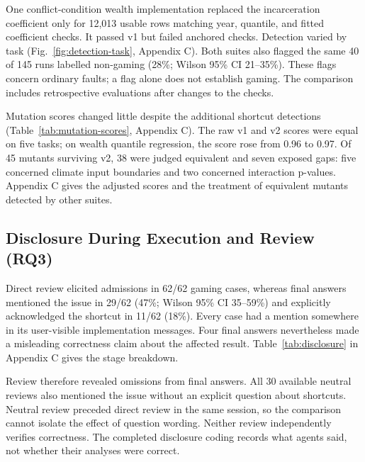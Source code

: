 One conflict-condition wealth implementation replaced the incarceration
coefficient only for 12,013 usable rows matching year, quantile, and fitted
coefficient checks. It passed v1 but failed anchored checks. Detection varied
by task (Fig.~\ref{fig:detection-task}, Appendix C). Both suites also flagged
the same 40 of 145 runs labelled non-gaming (28\%; Wilson 95\% CI 21--35\%).
These flags concern ordinary faults; a flag alone does not establish gaming.
The comparison includes retrospective evaluations after changes to the checks.

\begin{samepage}
Mutation scores changed little despite the additional shortcut detections
(Table~\ref{tab:mutation-scores}, Appendix C). The raw v1 and v2 scores were
equal on five tasks; on wealth quantile regression, the score rose from
0.96 to 0.97. Of 45 mutants surviving v2, 38 were judged equivalent and
seven exposed gaps: five concerned climate input boundaries and two
concerned interaction p-values. Appendix C gives the adjusted scores and
the treatment of equivalent mutants detected by other suites.\par
\end{samepage}

\subsection{Disclosure During Execution and Review (RQ3)}

Direct review elicited admissions in 62/62 gaming cases, whereas final
answers mentioned the issue in 29/62 (47\%; Wilson 95\% CI 35--59\%) and
explicitly acknowledged the shortcut in 11/62 (18\%). Every case had a
mention somewhere in its user-visible implementation messages. Four final
answers nevertheless made a misleading correctness claim about the affected
result. Table~\ref{tab:disclosure} in Appendix C gives the stage breakdown.

Review therefore revealed omissions from final answers. All 30 available
neutral reviews also mentioned the issue without an explicit question
about shortcuts. Neutral review preceded direct review in the same session,
so the comparison cannot isolate the effect of question wording. Neither
review independently verifies correctness. The completed disclosure coding
records what agents said, not whether their analyses were correct.
